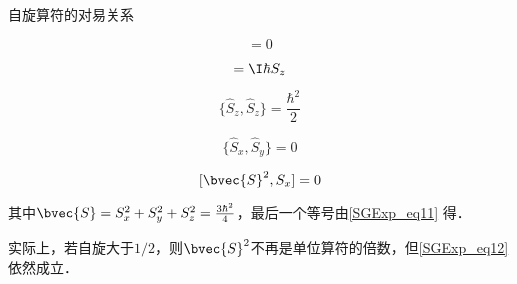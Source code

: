 \begin{theorem}{自旋算符的对易关系}

\begin{equation}
[\hat{S}_z, \hat{S}_z]=0
\end{equation}

\begin{equation}
[\hat{S}_x, \hat{S}_y]=\I\hbar S_z
\end{equation}

\begin{equation}\label{SGExp_eq11}
\{\hat{S}_z, \hat{S}_z\}=\frac{\hbar^2}{2}
\end{equation}

\begin{equation}
\{\hat{S}_x, \hat{S}_y\}=0
\end{equation}

\begin{equation}\label{SGExp_eq12}
[\bvec{S}^2, S_x]=0
\end{equation}

其中$\bvec{S}=S_x^2+S_y^2+S_z^2=\frac{3\hbar^2}{4}$，最后一个等号由\autoref{SGExp_eq11} 得．

\end{theorem}

实际上，若自旋大于$1/2$，则$\bvec{S}^2$不再是单位算符的倍数，但\autoref{SGExp_eq12} 依然成立．










